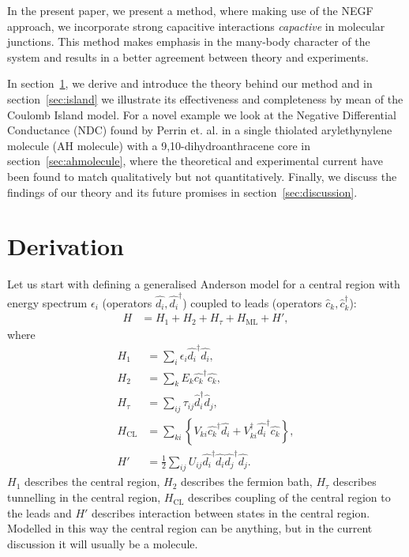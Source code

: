 \documentclass{article}
\begin{document}
\begin{multicols}{2}
        In the present paper, we present a method, where making use of the NEGF approach, we incorporate strong capacitive interactions \emph{capactive} in molecular junctions. This method makes emphasis in the many-body character of the system and results in a better agreement between theory and experiments.
        
        In section~\ref{sec:derivation}, we derive and introduce the theory behind our method and in section~\ref{sec:island} we illustrate its effectiveness and completeness by mean of the Coulomb Island model. For a novel example we look at the Negative Differential Conductance (NDC) found by Perrin et. al. \cite{perrinnano} in a single thiolated arylethynylene molecule (AH molecule) with a 9,10-dihydroanthracene core in section~\ref{sec:ahmolecule}, where the theoretical and experimental current have been found to match qualitatively but not quantitatively. Finally, we discuss the findings of our theory and its future promises in section~\ref{sec:discussion}.

    
    \section{Derivation}\label{sec:derivation}
        Let us start with defining a generalised Anderson model for a central region with energy spectrum $\epsilon_i$ (operators $\hat{d_i}, \hat{d_i}^\dagger$) coupled to leads (operators $\hat{c}_k, \hat{c}_k^\dagger$):
        \begin{align}
            H &= H_1 + H_2 + H_\tau + H_\text{ML} + H', \label{eq:hamiltonian}
        \end{align}
        where
        \begin{align*}
        H_1 &= \sum_i \epsilon_i \hat{d_i}^\dagger \hat{d_i}, \\
        H_2 &= \sum_k E_k \hat{c_k}^\dagger \hat{c_k}, \\
        H_\tau &= \sum_{ij} \tau_{ij} \hat{d}_i^\dagger \hat{d}_j, \\
        H_\text{CL} &= \sum_{ki}\left\{ V_{ki} \hat{c_k}^\dagger \hat{d_i} +  V_{ki}^\dagger \hat{d_i}^\dagger \hat{c_k} \right\},\\
        H' &= \frac{1}{2} \sum_{ij} U_{ij} \hat{d_i}^\dagger \hat{d_i}\hat{d_j}^\dagger \hat{d_j}.
        \end{align*}
        $H_1$ describes the central region, $H_2$ describes the fermion bath, $H_\tau$ describes tunnelling in the central region, $H_\text{CL}$ describes coupling of the central region to the leads and $H'$ describes interaction between states in the central region. Modelled in this way the central region can be anything, but in the current discussion it will usually be a molecule.
    

\end{multicols}
\end{document}
